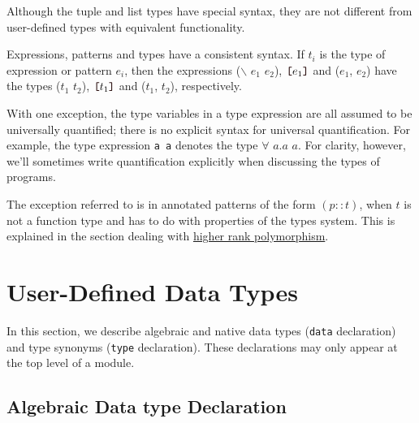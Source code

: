 Although the tuple and list types have special syntax, they are not different from user-defined types with equivalent functionality.


Expressions, patterns and types have a consistent syntax. If $t_i$ is the type of expression or pattern $e_i$, then the expressions
($\backslash$ $e_1$ \arrow{} $e_2$),
$\bracka{}e_1\brackz{}$
and ($e_1$, $e_2$) have the types
($t_1$ \arrow{} $t_2$), $\bracka{}t_1\brackz{}$ and ($t_1$, $t_2$),
respectively.

With one exception, the type variables in a type expression are all assumed to be universally quantified; there is no explicit syntax for universal quantification. For example, the type expression \texttt{a \arrow{} a} denotes the type $\forall$ $a$.$a$ \arrow{} $a$.
For clarity, however, we'll sometimes write quantification explicitly when discussing the types of \frege{} programs.

The exception referred to is in annotated patterns of the form $(p::t)$, when $t$ is not a function type and has to do with properties of the types system. This is explained in the section dealing with \hyperref[higher-rank]{higher rank polymorphism}.


\section{User-Defined Data Types}   

In this section, we describe algebraic and native data types (\texttt{data} declaration) and type synonyms (\texttt{type} declaration). These declarations may only appear at the top level of a module.

\subsection{Algebraic Data type Declaration}   \label{algdcl}

\begin{flushleft}
    \sym{=}  \\
 \\
  
  \alt\   \bracea{} \bracez{}\\
\end{flushleft}

